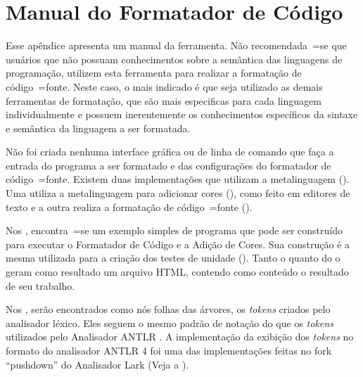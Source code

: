 

\chapter{Manual do Formatador de Código}
\label{manualDoFormatadorDeCodigo}


Esse apêndice apresenta um manual da ferramenta.
Não recomendada~=se que usuários que não possuam conhecimentos sobre a semântica das linguagens de programação,
utilizem esta ferramenta para realizar a formatação de código~=fonte.
Neste caso,
o mais indicado é que seja utilizado as demais ferramentas de formatação,
que são mais especificas para cada linguagem individualmente e
possuem inerentemente os conhecimentos específicos da sintaxe e
semântica da linguagem a ser formatada.

Não foi criada nenhuma interface gráfica ou
de linha de comando que faça a entrada do programa a ser formatado e
das configurações do formatador de código~=fonte.
Existem duas implementações que utilizam a metalinguagem ().
Uma utiliza a metalinguagem para adicionar cores (),
como feito em editores de texto e
a outra realiza a formatação de código~=fonte ().

Nos ,
encontra~=se um exemplo simples de programa que pode ser construído para executar o Formatador de Código e
a Adição de Cores.
Sua construção é a mesma utilizada para a criação dos testes de unidade ().
Tanto o  quanto do o  geram como resultado um arquivo HTML,
contendo como conteúdo o resultado de seu trabalho.

Nos ,
serão encontrados como nós folhas das árvores,
os \textit{tokens} criados pelo analisador léxico.
Eles seguem o mesmo padrão de notação do que os \textit{tokens} utilizados pelo Analisador ANTLR \cite{antlrBookTerrentParr}.
A implementação da exibição dos \textit{tokens} no formato do analisador ANTLR 4 foi uma das implementações feitas no fork ``pushdown'' do Analisador Lark (Veja a ).

